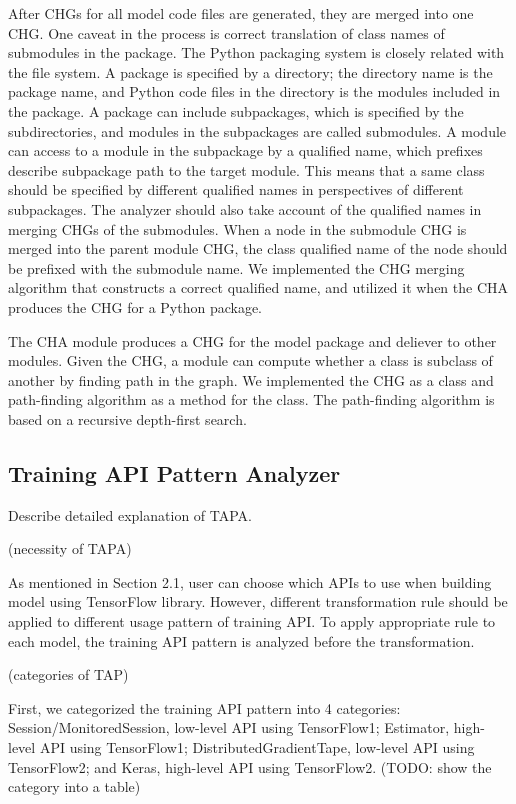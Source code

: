 After CHGs for all model code files are generated, 
they are merged into one CHG.
One caveat in the process is correct translation of class names
of submodules in the package.
The Python packaging system is closely related with the file system.
A package is specified by a directory; 
the directory name is the package name, 
and Python code files in the directory is the modules included in the package.
A package can include subpackages, which is specified
by the subdirectories, and modules in the subpackages are called submodules.
A module can access to a module in the subpackage by a qualified name,
which prefixes describe subpackage path to the target module.
This means that a same class should be specified by different qualified
names in perspectives of different subpackages.
The analyzer should also take account of the qualified names
in merging CHGs of the submodules. 
When a node in the submodule CHG is merged into the parent module CHG,
the class qualified name of the node should be prefixed with the
submodule name.
We implemented the CHG merging algorithm that constructs a correct
qualified name, and utilized it when the CHA produces the CHG for
a Python package. 

The CHA module produces a CHG for the model package and deliever to
other modules. Given the CHG, a module can compute whether a class is
subclass of another by finding path in the graph.
We implemented the CHG as a class and path-finding algorithm as
a method for the class. The path-finding algorithm is based on
a recursive depth-first search.

\subsection{Training API Pattern Analyzer}
Describe detailed explanation of TAPA.

(necessity of TAPA)

As mentioned in Section 2.1, user can choose which APIs to use
when building model using TensorFlow library.
However, different transformation rule should be applied
to different usage pattern of training API.
To apply appropriate rule to each model,
the training API pattern is analyzed before the transformation.

(categories of TAP)

First, we categorized the training API pattern into 4 categories:
Session/MonitoredSession, low-level API using TensorFlow1;
Estimator, high-level API using TensorFlow1;
DistributedGradientTape, low-level API using TensorFlow2;
and Keras, high-level API using TensorFlow2.
(TODO: show the category into a table)

